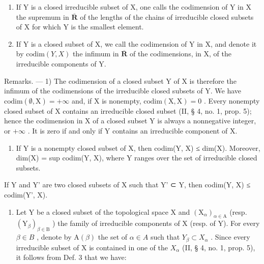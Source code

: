 \begin{enumerate}
\def\labelenumi{\alph{enumi})}
\item
  If Y is a closed irreducible subset of X, one calls the codimension of Y in X the supremum in \(\overline{\mathbf{R}}\) of the lengths of the chains of irreducible closed subsets of X for which Y is the smallest element.
\item
  If Y is a closed subset of X, we call the codimension of Y in X, and denote it by \(\text{codim}(Y, X)\) the infimum in \(\overline{\mathbf{R}}\) of the codimensions, in X, of the irreducible components of Y.
\end{enumerate}

Remarks. --- 1) The codimension of a closed subset Y of X is therefore the infimum of the codimensions of the irreducible closed subsets of Y. We have \(\mathrm{codim}(\emptyset, \mathrm{X}) = +\infty\) and, if X is nonempty, \(\mathrm{codim}(\mathrm{X}, \mathrm{X}) = 0\) . Every nonempty closed subset of X contains an irreducible closed subset (II, § 4, no. 1, prop. 5); hence the codimension in X of a closed subset Y is always a nonnegative integer, or \(+\infty\) . It is zero if and only if Y contains an irreducible component of X.

\begin{enumerate}
\def\labelenumi{\arabic{enumi})}
\setcounter{enumi}{1}
\tightlist
\item
  If Y is a nonempty closed subset of X, then codim(Y, X) ≤ dim(X). Moreover, dim(X) = sup codim(Y, X), where Y ranges over the set of irreducible closed subsets.
\end{enumerate}

If Y and Y' are two closed subsets of X such that Y' ⊂ Y, then codim(Y, X) ≤ codim(Y', X).

\begin{enumerate}
\def\labelenumi{\arabic{enumi})}
\setcounter{enumi}{2}
\tightlist
\item
  Let Y be a closed subset of the topological space X and \((\mathrm{X}_{\alpha})_{\alpha\in\mathrm{A}}\) (resp. \((\mathrm{Y}_{\beta})_{\beta\in\mathrm{B}}\) ) the family of irreducible components of X (resp. of Y). For every \(\beta\in B\) , denote by \(\mathrm{A}(\beta)\) the set of \(\alpha\in A\) such that \(Y_{\beta}\subset X_{\alpha}\) . Since every irreducible subset of X is contained in one of the \(X_{\alpha}\) (II, § 4, no. 1, prop. 5), it follows from Def. 3 that we have:
\end{enumerate}

